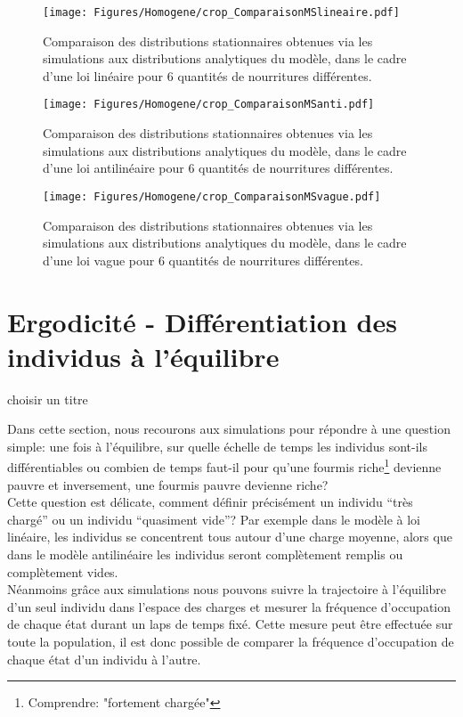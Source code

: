 \begin{figure}[h]
\centering
\texttt{[image: Figures/Homogene/crop\_ComparaisonMSlineaire.pdf]}
\caption{Comparaison des distributions stationnaires obtenues via les simulations aux distributions analytiques du modèle, dans le cadre d'une loi linéaire pour 6 quantités de nourritures différentes.}
\label{ComparaisonMSlineaire}
\end{figure}

\begin{figure}[h]
\centering
\texttt{[image: Figures/Homogene/crop\_ComparaisonMSanti.pdf]}
\caption{Comparaison des distributions stationnaires obtenues via les simulations aux distributions analytiques du modèle, dans le cadre d'une loi antilinéaire pour 6 quantités de nourritures différentes.}
\label{ComparaisonMSanti}
\end{figure}

\begin{figure}[h]
\centering
\texttt{[image: Figures/Homogene/crop\_ComparaisonMSvague.pdf]}
\caption{Comparaison des distributions stationnaires obtenues via les simulations aux distributions analytiques du modèle, dans le cadre d'une loi vague pour 6 quantités de nourritures différentes.}
\label{ComparaisonMSvague}
\end{figure}

\section{Ergodicité - Différentiation des individus à l'équilibre}

choisir un titre

Dans cette section, nous recourons aux simulations pour répondre à une question simple: une fois à l'équilibre, sur quelle échelle de temps les individus sont-ils différentiables ou combien de temps faut-il pour qu'une fourmis riche\footnote{Comprendre: "fortement chargée"} devienne pauvre et inversement, une fourmis pauvre devienne riche?\\

Cette question est délicate, comment définir précisément un individu ``très chargé'' ou un individu ``quasiment vide''? Par exemple dans le modèle à loi linéaire, les individus se concentrent tous autour d'une charge moyenne, alors que dans le modèle antilinéaire les individus seront complètement remplis ou complètement vides.\\

Néanmoins grâce aux simulations nous pouvons suivre la trajectoire à l'équilibre d'un seul individu dans l'espace des charges et mesurer la fréquence d'occupation de chaque état durant un laps de temps fixé. Cette mesure peut être effectuée sur toute la population, il est donc possible de comparer la fréquence d'occupation de chaque état d'un individu à l'autre.\\


